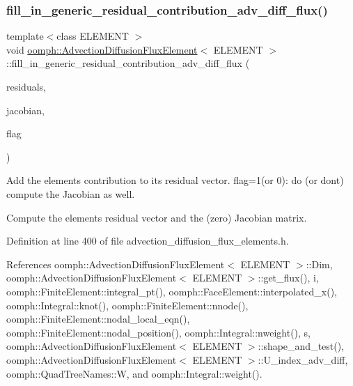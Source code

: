 \mbox{\label{classoomph_1_1AdvectionDiffusionFluxElement_acbc0c8e1e486601c0f09f7ecbb1995c4}} 
\subsubsection{\texorpdfstring{fill\+\_\+in\+\_\+generic\+\_\+residual\+\_\+contribution\+\_\+adv\+\_\+diff\+\_\+flux()}{fill\_in\_generic\_residual\_contribution\_adv\_diff\_flux()}}
{\footnotesize\ttfamily template$<$class E\+L\+E\+M\+E\+NT $>$ \\
void \hyperlink{classoomph_1_1AdvectionDiffusionFluxElement}{oomph\+::\+Advection\+Diffusion\+Flux\+Element}$<$ E\+L\+E\+M\+E\+NT $>$\+::fill\+\_\+in\+\_\+generic\+\_\+residual\+\_\+contribution\+\_\+adv\+\_\+diff\+\_\+flux (\begin{DoxyParamCaption}\item[{\hyperlink{classoomph_1_1Vector}{Vector}$<$ double $>$ \&}]{residuals,  }\item[{\hyperlink{classoomph_1_1DenseMatrix}{Dense\+Matrix}$<$ double $>$ \&}]{jacobian,  }\item[{unsigned}]{flag }\end{DoxyParamCaption})\hspace{0.3cm}{\ttfamily [private]}}



Add the element\textquotesingle{}s contribution to its residual vector. flag=1(or 0)\+: do (or don\textquotesingle{}t) compute the Jacobian as well. 

Compute the element\textquotesingle{}s residual vector and the (zero) Jacobian matrix. 

Definition at line 400 of file advection\+\_\+diffusion\+\_\+flux\+\_\+elements.\+h.



References oomph\+::\+Advection\+Diffusion\+Flux\+Element$<$ E\+L\+E\+M\+E\+N\+T $>$\+::\+Dim, oomph\+::\+Advection\+Diffusion\+Flux\+Element$<$ E\+L\+E\+M\+E\+N\+T $>$\+::get\+\_\+flux(), i, oomph\+::\+Finite\+Element\+::integral\+\_\+pt(), oomph\+::\+Face\+Element\+::interpolated\+\_\+x(), oomph\+::\+Integral\+::knot(), oomph\+::\+Finite\+Element\+::nnode(), oomph\+::\+Finite\+Element\+::nodal\+\_\+local\+\_\+eqn(), oomph\+::\+Finite\+Element\+::nodal\+\_\+position(), oomph\+::\+Integral\+::nweight(), s, oomph\+::\+Advection\+Diffusion\+Flux\+Element$<$ E\+L\+E\+M\+E\+N\+T $>$\+::shape\+\_\+and\+\_\+test(), oomph\+::\+Advection\+Diffusion\+Flux\+Element$<$ E\+L\+E\+M\+E\+N\+T $>$\+::\+U\+\_\+index\+\_\+adv\+\_\+diff, oomph\+::\+Quad\+Tree\+Names\+::W, and oomph\+::\+Integral\+::weight().



